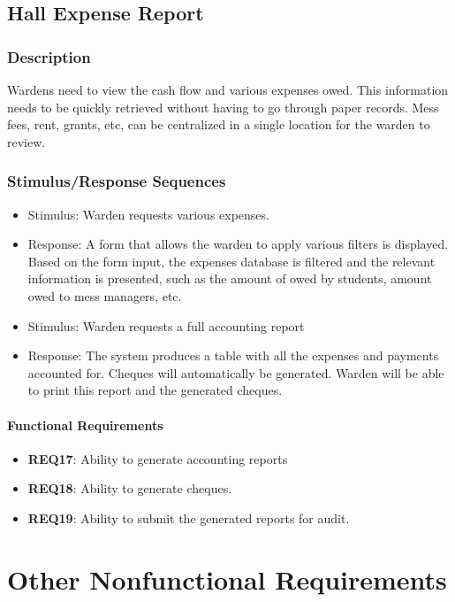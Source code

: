 \documentclass{scrreprt}
\begin{document}
\section{Hall Expense Report}
\subsection{Description}
Wardens need to view the cash flow and various expenses owed. This information needs to be quickly retrieved without having to go through paper records. Mess fees, rent, grants, etc, can be centralized in a single location for the warden to review.
\subsection{Stimulus/Response Sequences}
\begin{itemize}
    \item Stimulus: Warden requests various expenses.
    \item Response: A form that allows the warden to apply various filters is displayed. Based on the form input, the expenses database is filtered and the relevant information is presented, such as the amount of owed by students, amount owed to mess managers, etc.
\end{itemize}

\begin{itemize}
    \item Stimulus: Warden requests a full accounting report
    \item Response: The system produces a table with all the expenses and payments accounted for. Cheques will automatically be generated. Warden will be able to print this report and the generated cheques.
\end{itemize}
\subsubsection{Functional Requirements}
\begin{itemize}
    \item \textbf{REQ17}: Ability to generate accounting reports
    \item \textbf{REQ18}: Ability to generate cheques.
    \item \textbf{REQ19}: Ability to submit the generated reports for audit.
\end{itemize}

\chapter{Other Nonfunctional Requirements}
\end{document}
